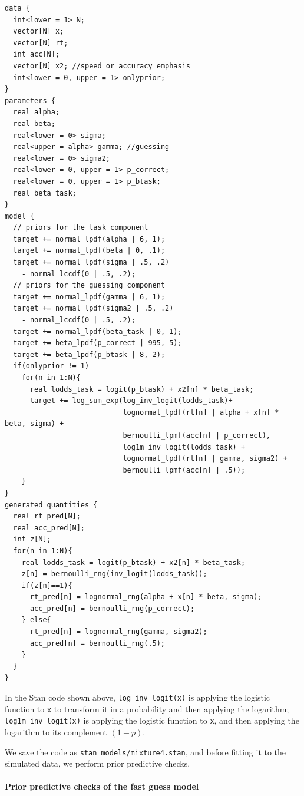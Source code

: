 \documentclass[12pt,]{krantz}
\let\oldparagraph\paragraph
\renewcommand{\paragraph}[1]{\oldparagraph{#1}\mbox{}}
\theoremstyle{definition}
\theoremstyle{definition}
\theoremstyle{definition}
\theoremstyle{remark}
\begin{document}
\begin{verbatim}
data {
  int<lower = 1> N;
  vector[N] x;
  vector[N] rt;
  int acc[N];
  vector[N] x2; //speed or accuracy emphasis
  int<lower = 0, upper = 1> onlyprior;
}
parameters {
  real alpha;
  real beta;
  real<lower = 0> sigma;
  real<upper = alpha> gamma; //guessing
  real<lower = 0> sigma2;
  real<lower = 0, upper = 1> p_correct;
  real<lower = 0, upper = 1> p_btask;
  real beta_task;
}
model {
  // priors for the task component
  target += normal_lpdf(alpha | 6, 1);
  target += normal_lpdf(beta | 0, .1);
  target += normal_lpdf(sigma | .5, .2)
    - normal_lccdf(0 | .5, .2);
  // priors for the guessing component
  target += normal_lpdf(gamma | 6, 1);
  target += normal_lpdf(sigma2 | .5, .2)
    - normal_lccdf(0 | .5, .2);
  target += normal_lpdf(beta_task | 0, 1);
  target += beta_lpdf(p_correct | 995, 5);
  target += beta_lpdf(p_btask | 8, 2);
  if(onlyprior != 1)
    for(n in 1:N){
      real lodds_task = logit(p_btask) + x2[n] * beta_task;
      target += log_sum_exp(log_inv_logit(lodds_task)+
                            lognormal_lpdf(rt[n] | alpha + x[n] * beta, sigma) +
                            bernoulli_lpmf(acc[n] | p_correct),
                            log1m_inv_logit(lodds_task) +
                            lognormal_lpdf(rt[n] | gamma, sigma2) +
                            bernoulli_lpmf(acc[n] | .5));
    }
}
generated quantities {
  real rt_pred[N];
  real acc_pred[N];
  int z[N]; 
  for(n in 1:N){
    real lodds_task = logit(p_btask) + x2[n] * beta_task;
    z[n] = bernoulli_rng(inv_logit(lodds_task));
    if(z[n]==1){
      rt_pred[n] = lognormal_rng(alpha + x[n] * beta, sigma);
      acc_pred[n] = bernoulli_rng(p_correct);
    } else{
      rt_pred[n] = lognormal_rng(gamma, sigma2);
      acc_pred[n] = bernoulli_rng(.5);
    }
  }
}
\end{verbatim}

In the Stan code shown above, \texttt{log\_inv\_logit(x)} is applying the logistic function to \texttt{x} to transform it in a probability and then applying the logarithm; \texttt{log1m\_inv\_logit(x)} is applying the logistic function to \texttt{x}, and then applying the logarithm to its complement \((1 - p)\).

We save the code as \texttt{stan\_models/mixture4.stan}, and before fitting it to the simulated data, we perform prior predictive checks.

\hypertarget{prior-predictive-checks-of-the-fast-guess-model}{%
\paragraph{Prior predictive checks of the fast guess model}\label{prior-predictive-checks-of-the-fast-guess-model}}
\end{document}
